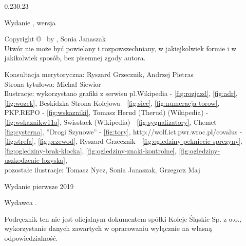 \clearpage

\begin{adjustwidth}{0.23\textwidth}{0.23\textwidth}
\begingroup
  \null\vfill
  \begin{center}
  \utitle\par
  Wydanie \uedition, wersja \urevision\par
  Copyright \copyright{} \udate\ by \uauthor, Sonia Janaszak\\
  Utwór nie może być powielany i rozpowszechniany, w jakiejkolwiek formie
  i w jakikolwiek sposób, bez pisemnej zgody autora.\par  
  

Konsultacja merytoryczna: Ryszard Grzecznik, Andrzej Pietras\\
Strona tytułowa: Michał Siewior\\
Ilustracje: wykorzystano grafiki z serwisu pl.Wikipedia - \ref{fig:rozjazd}, \ref{fig:adr}, \ref{fig:wozek}, Beskidzka Strona Kolejowa  - \ref{fig:siec}, \ref{fig:numeracja-torow}, PKP.REPO - \ref{fig:wskazniki}, Tomasz Herud (Therud) (Wikipedia) - \ref{fig:wskaznikw11a}, Swisstack (Wikipedia) - \ref{fig:sygnalizatory}, Chemet - \ref{fig:cysterna}, ''Drogi Szynowe'' - \ref{fig:tory}, http://wolf.ict.pwr.wroc.pl/covalus - \ref{fig:strefa}, \ref{fig:przewod}, Ryszard Grzecznik - \ref{fig:ogledziny-pekniecie-sprezyny}, \ref{fig:ogledziny-brak-klocka}, \ref{fig:ogledziny-znaki-kontrolne}, \ref{fig:ogledziny-uszkodzenie-lozyska},
\\pozostałe ilustracje: Tomasz Nycz, Sonia Janaszak, Grzegorz Maj
\par
  
  Wydanie pierwsze 2019\par
  Wydawca \upublisher.\par
  Podręcznik ten nie jest oficjalnym dokumentem spółki Koleje Śląskie Sp. z o.o., wykorzystanie danych zawartych w opracowaniu wyłącznie na własną odpowiedzialność.\par

  \uwebsite
  \end{center}
  \vspace*{10mm}
\endgroup
\end{adjustwidth}

\clearpage